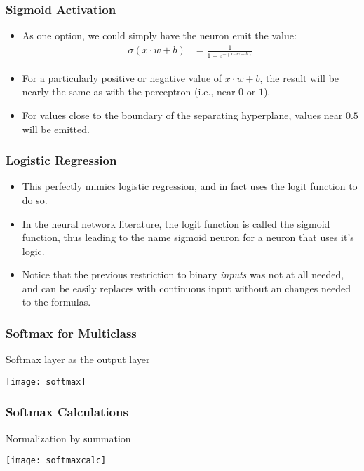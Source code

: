 \begin{frame}[fragile] \frametitle{Sigmoid Activation}

\begin{itemize}
\item As one option, we could simply have the neuron emit the
value:
\begin{align*}
\sigma(x \cdot w + b) &= \frac{1}{1 + e^{-(x \cdot w + b)}}
\end{align*}
\item For a particularly positive or negative value of $x \cdot w + b$,
the result will be nearly the same as with the perceptron (i.e.,
near $0$ or $1$).
\item For values close to the boundary of the separating
hyperplane, values near $0.5$ will be emitted.
\end{itemize}

\end{frame}

\begin{frame}[fragile] \frametitle{Logistic Regression}

\begin{itemize}
\item 
This perfectly mimics logistic regression, and in fact uses the
logit function to do so. 
\item In the neural network literature, the
logit function is called the {sigmoid} function, thus leading
to the name {sigmoid neuron} for a neuron that uses it's logic.
\item 
Notice that the previous restriction to binary \textit{inputs} was
not at all needed, and can be easily replaces with continuous input
without an changes needed to the formulas.
\end{itemize}
\end{frame}


\begin{frame}[fragile] \frametitle{Softmax for Multiclass}
Softmax layer as the output layer

\begin{center}
\texttt{[image: softmax]}
\end{center}

\end{frame}

\begin{frame}[fragile] \frametitle{Softmax Calculations}
Normalization by summation

\begin{center}
\texttt{[image: softmaxcalc]}
\end{center}

\end{frame}



